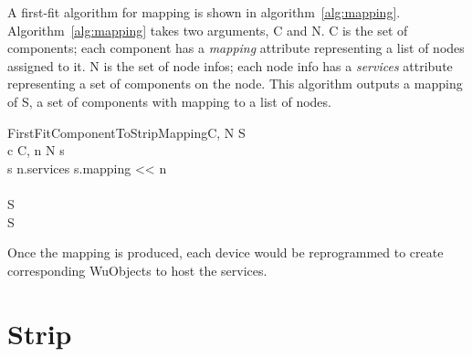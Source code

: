 A first-fit algorithm for mapping is shown in algorithm~\ref{alg:mapping}.
Algorithm~\ref{alg:mapping} takes two arguments, C and N. C is the set of
components; each component has a \textit{mapping} attribute representing a list
of nodes assigned to it. N is the set of node infos; each node info has
a \textit{services} attribute representing a set of components on the node. This
algorithm outputs a mapping of S, a set of components with mapping to a list of
nodes. 

\begin{pseudocode}[framebox]{FirstFitComponentToStripMapping}{C, N}
\label{alg:mapping}
S \GETS{\emptyset} \\

\FOREACH c \in C, n \in N \DO
  \BEGIN
    s  \\
    \IF s \in n.services \THEN
      \BEGIN
        s.mapping << n \\
      \END \\
    S 
  \END \\

\RETURN S
\end{pseudocode}


Once the mapping is produced, each device would be reprogrammed to create
corresponding WuObjects to host the services.

\section{Strip}
\label{s:ss}

